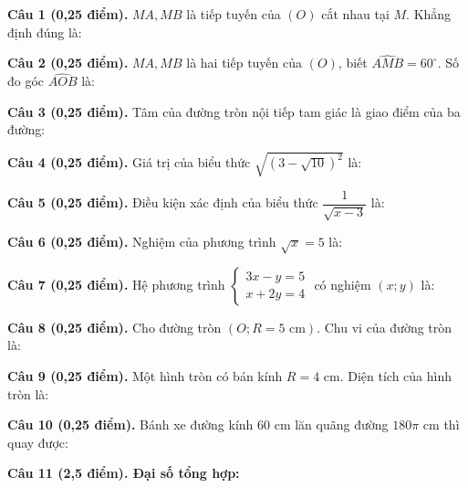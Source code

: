 \documentclass[12pt,a4paper]{article}
\begin{document}
\vspace{1.2mm}
\noindent\textbf{Câu 1 (0,25 điểm).} $MA, MB$ là tiếp tuyến của $(O)$ cắt nhau tại $M$. Khẳng định đúng là: \par\vspace{0.5mm}
\noindent\textbf{Câu 2 (0,25 điểm).} $MA, MB$ là hai tiếp tuyến của $(O)$, biết $\widehat{AMB} = 60^\circ$. Số đo góc $\widehat{AOB}$ là: \par\vspace{0.5mm}
\noindent\textbf{Câu 3 (0,25 điểm).} Tâm của đường tròn nội tiếp tam giác là giao điểm của ba đường: \par\vspace{0.5mm}
\noindent\textbf{Câu 4 (0,25 điểm).} Giá trị của biểu thức $\sqrt{(3 - \sqrt{10})^2}$ là: \par\vspace{0.5mm}
\noindent\textbf{Câu 5 (0,25 điểm).} Điều kiện xác định của biểu thức $\dfrac{1}{\sqrt{x - 3}}$ là: \par\vspace{0.5mm}
\noindent\textbf{Câu 6 (0,25 điểm).} Nghiệm của phương trình $\sqrt{x} = 5$ là: \par\vspace{0.5mm}
\noindent\textbf{Câu 7 (0,25 điểm).} Hệ phương trình $\begin{cases} 3x - y = 5 \\ x + 2y = 4 \end{cases}$ có nghiệm $(x; y)$ là: \par\vspace{0.5mm}
\noindent\textbf{Câu 8 (0,25 điểm).} Cho đường tròn $(O; R = 5\text{ cm})$. Chu vi của đường tròn là: \par\vspace{0.5mm}
\noindent\textbf{Câu 9 (0,25 điểm).} Một hình tròn có bán kính $R = 4\text{ cm}$. Diện tích của hình tròn là: \par\vspace{0.5mm}
\noindent\textbf{Câu 10 (0,25 điểm).} Bánh xe đường kính $60\text{ cm}$ lăn quãng đường $180\pi\text{ cm}$ thì quay được: \par\vspace{0.5mm}
\vspace{0.8mm}
\noindent\textbf{Câu 11 (2,5 điểm). Đại số tổng hợp:}
\vspace{0.6mm}
\end{document}
